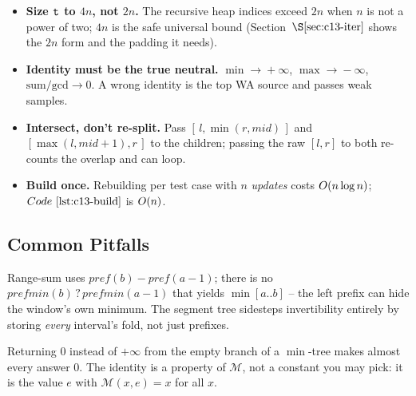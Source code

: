 \begin{hardeningbox}
\begin{itemize}[nosep,leftmargin=1.4em]
  \item \textbf{Size \(\texttt{t}\) to \(4n\), not \(2n\).}  The recursive heap
        indices exceed \(2n\) when \(n\) is not a power of two; \(4n\) is the
        safe universal bound (Section~\(\secref{c13-iter}\) shows the \(2n\)
        form and the padding it needs).
  \item \textbf{Identity must be the true neutral.}  \(\min\!\to\!+\infty\),
        \(\max\!\to\!-\infty\), \(\text{sum/gcd}\!\to\!0\).  A wrong identity is
        the top WA source and passes weak samples.
  \item \textbf{Intersect, don't re-split.}  Pass \([\,l,\min(r,mid)\,]\) and
        \([\max(l,mid{+}1),r\,]\) to the children; passing the raw \([l,r]\)
        to both re-counts the overlap and can loop.
  \item \textbf{Build once.}  Rebuilding per test case with \(n\) \emph{updates}
        costs \(O(n\log n)\); \(\coderef{c13-build}\) is \(O(n)\).
\end{itemize}
\end{hardeningbox}

\subsection{Common Pitfalls}

\begin{warningbox}
Range-sum uses \(\mathit{pref}(b)-\mathit{pref}(a{-}1)\); there is no
\(\mathit{prefmin}(b)\,\text{?}\,\mathit{prefmin}(a{-}1)\) that yields
\(\min[a..b]\) -- the left prefix can hide the window's own minimum.  The
segment tree sidesteps invertibility entirely by storing \emph{every} interval's
fold, not just prefixes.
\end{warningbox}

\begin{warningbox}
Returning \(0\) instead of \(+\infty\) from the empty branch of a
\(\min\)-tree makes almost every answer \(0\).  The identity is a property of
\(\mathcal{M}\), not a constant you may pick: it is the value \(e\) with
\(\mathcal{M}(x,e)=x\) for all \(x\).
\end{warningbox}

